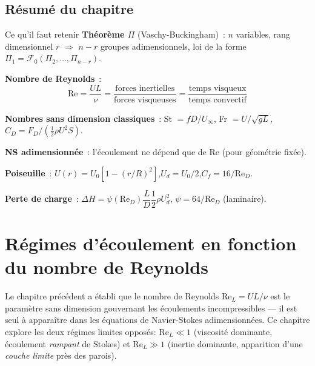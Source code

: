 \documentclass[11pt,a4paper]{report}
\begin{document}
\section*{Résumé du chapitre}

\begin{importantbox}{Ce qu'il faut retenir}
\textbf{Théorème $\Pi$} (Vaschy-Buckingham)~: $n$ variables, rang dimensionnel $r$
$\Rightarrow$ $n-r$ groupes adimensionnels, loi de la forme
$\Pi_1 = \mathcal{F}_0(\Pi_2,\ldots,\Pi_{n-r})$.

\vspace{4pt}
\textbf{Nombre de Reynolds}~:
\[
    \mathrm{Re} = \frac{UL}{\nu} = \frac{\text{forces inertielles}}{\text{forces visqueuses}}
    = \frac{\text{temps visqueux}}{\text{temps convectif}}
\]

\vspace{4pt}
\textbf{Nombres sans dimension classiques}~:
\quad St $= fD/U_\infty$,\quad
Fr $= U/\!\sqrt{gL}$,\quad
$C_D = F_D/(\frac{1}{2}\rho U^2 S)$.

\vspace{4pt}
\textbf{NS adimensionnée}~: l'écoulement ne dépend que de Re (pour géométrie fixée).

\vspace{4pt}
\textbf{Poiseuille}~:
$U(r)=U_0[1-(r/R)^2]$,\quad $U_d=U_0/2$,\quad $C_f=16/\mathrm{Re}_D$.

\vspace{4pt}
\textbf{Perte de charge}~:
$\Delta H = \psi(\mathrm{Re}_D)\dfrac{L}{D}\dfrac{1}{2}\rho U_d^2$,\quad
$\psi = 64/\mathrm{Re}_D$ (laminaire).
\end{importantbox}

\chapter{R\'egimes d'\'ecoulement en fonction du nombre de Reynolds}

Le chapitre pr\'ec\'edent a \'etabli que le nombre de Reynolds $\mathrm{Re}_L = UL/\nu$
est le param\`etre sans dimension gouvernant les \'ecoulements incompressibles --- il est
seul \`a appara\^itre dans les \'equations de Navier-Stokes adimensionn\'ees. Ce chapitre
explore les deux r\'egimes limites oppos\'es: $\mathrm{Re}_L \ll 1$ (viscosit\'e dominante,
\'ecoulement \emph{rampant} de Stokes) et $\mathrm{Re}_L \gg 1$ (inertie dominante,
apparition d'une \emph{couche limite} pr\`es des parois).
\end{document}
